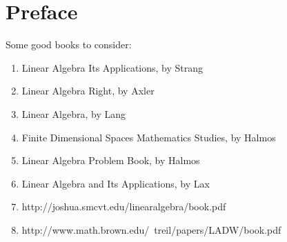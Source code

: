 \section{Preface}
Some good books to consider:
\begin{enumerate}
	\item Linear Algebra Its Applications, by Strang
	\item Linear Algebra Right, by Axler
	\item Linear Algebra, by Lang
	\item Finite Dimensional Spaces Mathematics Studies, by Halmos
	\item Linear Algebra Problem Book, by Halmos
	\item Linear Algebra and Its Applications, by Lax
	\item http://joshua.smcvt.edu/linearalgebra/book.pdf
	\item http://www.math.brown.edu/~treil/papers/LADW/book.pdf
\end{enumerate}

\newpage











